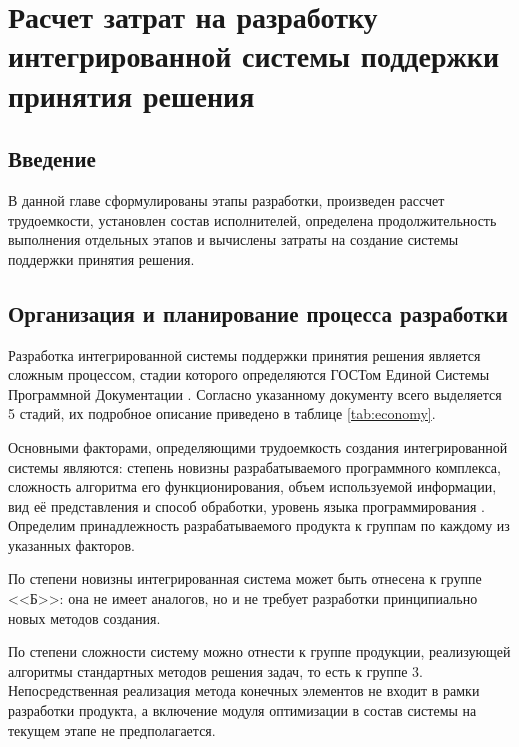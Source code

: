 \documentclass[14pt,oneside,final]{extreport}
\begin{document}
	\chapter{Расчет затрат на разработку интегрированной системы поддержки принятия решения}
	\section{Введение}
	В данной главе сформулированы этапы разработки, произведен рассчет трудоемкости, установлен состав исполнителей, определена продолжительность выполнения отдельных этапов и вычислены затраты на создание системы поддержки принятия решения.	
	
	\section{Организация и планирование процесса разработки}
	Разработка интегрированной системы поддержки принятия решения является сложным процессом, стадии которого определяются ГОСТом Единой Системы Программной Документации \cite{gost:19102}. Согласно указанному документу всего выделяется 5 стадий, их подробное описание приведено в таблице \ref{tab:economy}.
	
	Основными факторами, определяющими трудоемкость создания интегрированной системы являются: степень новизны разрабатываемого программного комплекса, сложность алгоритма его функционирования, объем используемой информации, вид её представления и способ обработки, уровень языка программирования \cite{metoda:Economy}. Определим принадлежность разрабатываемого продукта к группам по каждому из указанных факторов. 
	
	По степени новизны интегрированная система может быть отнесена к группе <<Б>>: она не имеет аналогов, но и не требует разработки принципиально новых методов создания. 
	
	По степени сложности систему можно отнести к группе продукции, реализующей алгоритмы стандартных методов 
	решения задач, то есть к группе 3. Непосредственная реализация метода конечных элементов не входит в рамки разработки продукта, а включение модуля оптимизации в состав системы  на текущем этапе не предполагается.  \newpage
\end{document}
